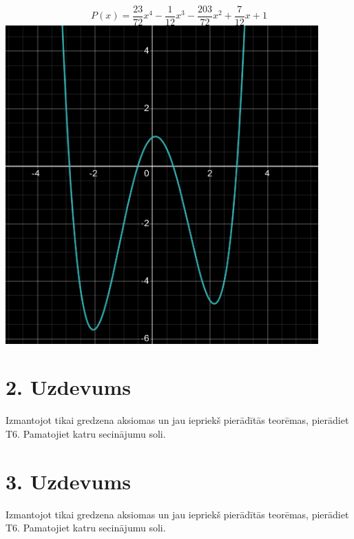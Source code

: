 \documentclass{article}
\begin{document}
\begin{equation*}
    P(x) = \frac{23}{72} x^4 - \frac{1}{12} x^3 - \frac{203}{72} x^2 + \frac{7}{12} x + 1
\end{equation*}
\includegraphics[width=0.9\textwidth, center]{1}

\section*{2. Uzdevums}
Izmantojot tikai gredzena aksiomas un jau iepriekš pierādītās teorēmas, pierādiet T6. Pamatojiet katru secinājumu soli.

\section*{3. Uzdevums}
Izmantojot tikai gredzena aksiomas un jau iepriekš pierādītās teorēmas, pierādiet T6. Pamatojiet katru secinājumu soli.
\end{document}
